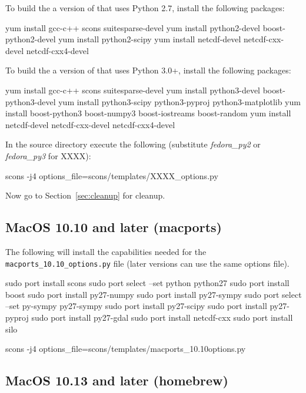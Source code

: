 \noindent To build the a version of \escript that uses Python 2.7, install the following packages:
\begin{shellCode}
yum install gcc-c++ scons suitesparse-devel
yum install python2-devel boost-python2-devel
yum install python2-scipy
yum install netcdf-devel netcdf-cxx-devel netcdf-cxx4-devel
\end{shellCode}

\noindent To build the a version of \escript that uses Python 3.0+, install the following packages:
\begin{shellCode}
yum install gcc-c++ scons suitesparse-devel
yum install python3-devel boost-python3-devel
yum install python3-scipy python3-pyproj python3-matplotlib
yum install boost-python3 boost-numpy3 boost-iostreams boost-random
yum install netcdf-devel netcdf-cxx-devel netcdf-cxx4-devel
\end{shellCode}

\noindent In the source directory execute the following (substitute \textit{fedora_py2} or \textit{fedora_py3} for XXXX):
\begin{shellCode}
scons -j4 options_file=scons/templates/XXXX_options.py
\end{shellCode}

\noindent Now go to Section~\ref{sec:cleanup} for cleanup.

\subsection{MacOS 10.10 and later (macports)}\label{sec:macportsrc}

The following will install the capabilities needed for the \texttt{macports_10.10_options.py} file (later versions can use the same options file).

\begin{shellCode}
sudo port install scons
sudo port select --set python python27
sudo port install boost
sudo port install py27-numpy
sudo port install py27-sympy
sudo port select --set py-sympy py27-sympy
sudo port install py27-scipy
sudo port install py27-pyproj
sudo port install py27-gdal
sudo port install netcdf-cxx
sudo port install silo
\end{shellCode}

\begin{shellCode}
scons -j4 options_file=scons/templates/macports_10.10options.py
\end{shellCode}


\subsection{MacOS 10.13 and later (homebrew)}\label{sec:homebrewsrc}

